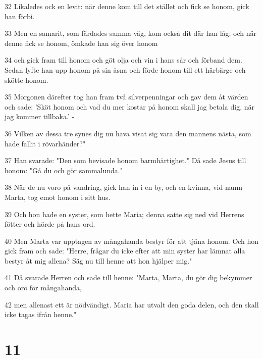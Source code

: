 \par 32 Likaledes ock en levit: när denne kom till det stället och fick se honom, gick han förbi.
\par 33 Men en samarit, som färdades samma väg, kom också dit där han låg; och när denne fick se honom, ömkade han sig över honom
\par 34 och gick fram till honom och göt olja och vin i hans sår och förband dem. Sedan lyfte han upp honom på sin åsna och förde honom till ett härbärge och skötte honom.
\par 35 Morgonen därefter tog han fram två silverpenningar och gav dem åt värden och sade: 'Sköt honom och vad du mer kostar på honom skall jag betala dig, när jag kommer tillbaka.' -
\par 36 Vilken av dessa tre synes dig nu hava visat sig vara den mannens nästa, som hade fallit i rövarhänder?"
\par 37 Han svarade: "Den som bevisade honom barmhärtighet." Då sade Jesus till honom: "Gå du och gör sammalunda."
\par 38 När de nu voro på vandring, gick han in i en by, och en kvinna, vid namn Marta, tog emot honom i sitt hus.
\par 39 Och hon hade en syster, som hette Maria; denna satte sig ned vid Herrens fötter och hörde på hans ord.
\par 40 Men Marta var upptagen av mångahanda bestyr för att tjäna honom. Och hon gick fram och sade: "Herre, frågar du icke efter att min syster har lämnat alla bestyr åt mig allena? Säg nu till henne att hon hjälper mig."
\par 41 Då svarade Herren och sade till henne: "Marta, Marta, du gör dig bekymmer och oro för mångahanda,
\par 42 men allenast ett är nödvändigt. Maria har utvalt den goda delen, och den skall icke tagas ifrån henne."

\chapter{11}


